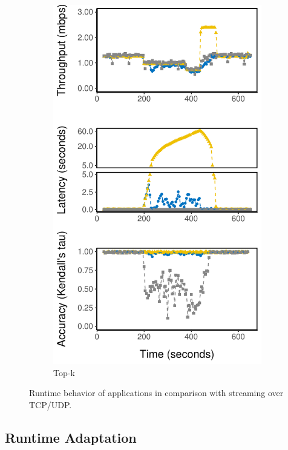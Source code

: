 \begin{figure}
\begin{subfigure}{0.33\textwidth}
    \includegraphics[width=\textwidth]{figures/runtime-topk-verticle.pdf}
    \caption{Top-k}
    \label{fig:tk-runtime}
  \end{subfigure}
  \caption{Runtime behavior of \sysname{} applications in comparison with
    streaming over TCP/UDP.}
  \label{fig:all-runtime}
\end{figure}

\newpage

\subsection{Runtime Adaptation}
\label{sec:runtime-adaptation}

